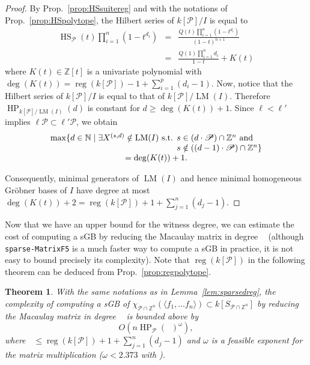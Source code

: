 \documentclass[12pt]{article}
\numberwithin{equation}{section}
\newtheorem{theorem}{Theorem}
\numberwithin{theorem}{section}
\newcommand{\Z}{\mathbb{Z}}
\DeclareMathOperator{\LM}{LM}
\DeclareMathOperator{\HP}{HP}
\DeclareMathOperator{\HS}{HS}
\newcommand{\sgp}{S}
\newcommand{\polytope}{\mathscr P}
\DeclareMathOperator{\reg}{reg}
\DeclareMathOperator{\dwit}{d_{wit}}
\newcommand{\N}{\mathbb{N}}
\begin{document}
\begin{proof}
By Prop.~\ref{prop:HSsuitereg} and with the notations of Prop.~\ref{prop:HSpolytope}, the
Hilbert series of $k[\polytope]/I$ is equal to
$$\begin{array}{rcl}
\HS_{\polytope}(t)\prod_{i=1}^n (1-t^{d_i})&=&\displaystyle\frac{Q(t)\prod_{i=1}^n
  (1-t^{d_i})}{(1-t)^{n+1}}\\
&=&\displaystyle\frac{Q(1)\prod_{i=1}^n d_i}{1-t}+K(t)
\end{array}
$$ where $K(t)\in\Z[t]$ is a univariate polynomial with
$\deg(K(t))=\reg(k[\polytope])-1+\sum_{i=1}^p(d_i-1)$.  Now, notice that
the Hilbert series of $k[\polytope]/I$ is equal to that of
$k[\polytope]/\LM(I)$. Therefore $\HP_{k[\polytope]/\LM(I)}(d)$ is
constant for $d\geq \deg(K(t))+1$. Since $\ell<\ell'$ implies $\ell\polytope\subset \ell'\polytope$, we obtain
$$\begin{array}{c}\max\{d\in\N\mid \exists X^{(s,d)}\notin \LM(I)\text{ s.t. }\begin{array}[t]{@{}l@{}}
s\in (d\cdot\polytope)\cap\Z^n \text{ and}\\
s\notin ((d-1)\cdot\polytope)\cap\Z^n
\}
  \end{array}\\=\deg(K(t))+1.
\end{array}
$$

Consequently,
minimal generators of $\LM(I)$ and hence minimal homogeneous Gr\"obner bases of
$I$ have degree at most $\deg(K(t))+2=\reg(k[\polytope])+1+\sum_{j=1}^n(d_j-1)$. 
\end{proof}

Now that we have an upper bound for the witness degree, we can estimate the cost of computing a sGB by reducing the Macaulay matrix in degree $\dwit$ (although {\tt sparse-MatrixF5} is a much faster way to compute a sGB in practice, it is not easy to bound precisely its complexity). Note that $\reg(k[\polytope])$ in the following theorem can be deduced from Prop.~\ref{prop:regpolytope}.

\begin{theorem}\label{theo:complF5}
With the same notations as in Lemma~\ref{lem:sparsedreg}, the
complexity of computing a sGB of $\chi_{\polytope\cap\Z^n}(\langle
f_1,\ldots f_n\rangle)\subset k[\sgp_{\polytope\cap\Z^n}]$
by reducing the Macaulay matrix in degree $\dwit$ is bounded above by
$$O\left(n 
\HP_\polytope(\dwit)^\omega\right),$$ where
$\dwit\leq\reg(k[\polytope])+1+\sum_{j=1}^n(d_j-1)$ and $\omega$ is a
feasible exponent for the matrix multiplication ($\omega<2.373$ with \cite{williams2012multiplying}).
\end{theorem}
\end{document}
